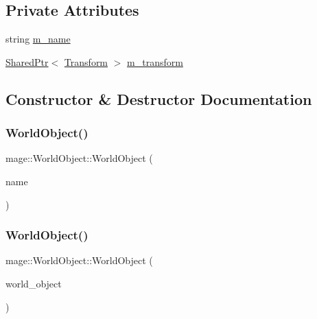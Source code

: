 \subsection*{Private Attributes}
\begin{DoxyCompactItemize}
\item 
string \hyperlink{classmage_1_1_world_object_a383cc5e1275f389459021a16b958049c}{m\+\_\+name}
\item 
\hyperlink{namespacemage_a1e01ae66713838a7a67d30e44c67703e}{Shared\+Ptr}$<$ \hyperlink{structmage_1_1_transform}{Transform} $>$ \hyperlink{classmage_1_1_world_object_a599102e219249b46e1cf60c98efd559c}{m\+\_\+transform}
\end{DoxyCompactItemize}


\subsection{Constructor \& Destructor Documentation}
\hypertarget{classmage_1_1_world_object_a40d714ae9da1e197171c55f8fd321cc4}{}\label{classmage_1_1_world_object_a40d714ae9da1e197171c55f8fd321cc4} 
\subsubsection{\texorpdfstring{World\+Object()}{WorldObject()}\hspace{0.1cm}{\footnotesize\ttfamily [1/3]}}
{\footnotesize\ttfamily mage\+::\+World\+Object\+::\+World\+Object (\begin{DoxyParamCaption}\item[{const string \&}]{name }\end{DoxyParamCaption})}

\hypertarget{classmage_1_1_world_object_a4e7ace41518b45c75d975c766de28143}{}\label{classmage_1_1_world_object_a4e7ace41518b45c75d975c766de28143} 
\subsubsection{\texorpdfstring{World\+Object()}{WorldObject()}\hspace{0.1cm}{\footnotesize\ttfamily [2/3]}}
{\footnotesize\ttfamily mage\+::\+World\+Object\+::\+World\+Object (\begin{DoxyParamCaption}\item[{const \hyperlink{classmage_1_1_world_object}{World\+Object} \&}]{world\+\_\+object }\end{DoxyParamCaption})}

